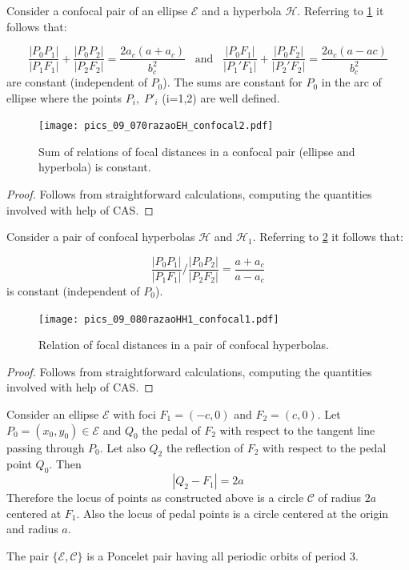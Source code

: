 \begin{proposition}
	Consider a confocal pair of an ellipse  $\mathcal{E}$ and a hyperbola $\mathcal{H}$. Referring to   \cref{fig:dEH} it follows that:
	
	\[\frac{|P_0P_1|}{|P_1F_1|}+\frac{|P_0P_2|}{|P_2F_2|}=\frac{2a_c(a+a_c)}{b_c^2}\;\;\; \text{and}\;\;\; \frac{|P_0F_1|}{|P_1'F_1|}+\frac{|P_0F_2|}{|P_2'F_2|}= \frac{2a_c(a-ac)}{b_c^2}\]
	are constant (independent of $P_0$).
 The sums  are constant for $P_0$ in the arc of ellipse  where the points $P_i,\; P'_i$ (i=1,2) are well defined.
\end{proposition}
\begin{figure} 
	\begin{center}
 \texttt{[image: pics\_09\_070razaoEH\_confocal2.pdf]}
		\caption { Sum of relations of focal distances in a confocal pair (ellipse and hyperbola) is constant.  }
		\label{fig:dEH}
	\end{center}
\end{figure}
\begin{proof}
Follows from straightforward calculations, computing the quantities involved with help of CAS. 
\end{proof}
\begin{proposition}
	Consider a pair of confocal hyperbolas $\mathcal{H}$ and $\mathcal{H}_1$. Referring to   \cref{fig:dHH} it follows that:
	
	\[\frac{|P_0P_1|}{|P_1F_1|}/\frac{|P_0P_2|}{|P_2F_2|}=\frac{a+a_c}{a-a_c}\]
	is constant (independent of $P_0$).
	
\end{proposition}
\begin{figure}
	\begin{center}
\texttt{[image: pics\_09\_080razaoHH1\_confocal1.pdf]}
		\caption { Relation of focal distances in a pair of confocal hyperbolas. }
		\label{fig:dHH}
	\end{center}
\end{figure}
\begin{proof}
Follows from straightforward calculations, computing the quantities involved with help of CAS. 
\end{proof}


\begin{proposition} \label{prop:pedal_circle} Consider an ellipse $\mathcal{E}$  with foci $F_1=(-c,0)$ and $F_2=(c,0)$. Let $P_0=(x_0,y_0)\in\mathcal{E}$ and $Q_0$ the pedal of $F_2$ with respect to the tangent line passing through $P_0$. Let also $Q_2$ the reflection of $F_2$ with respect to the pedal point $Q_0$.
	Then \[ |Q_2-F_1|=2a\]
	Therefore the locus of points as constructed above is a circle $\mathcal{C}$  of radius $2a$ centered at $F_1$.
	Also the locus of pedal points is a circle centered at the origin and radius $a$.
	
	The pair $\{\mathcal{E},\mathcal{C}\}$ is a Poncelet pair having all periodic orbits of period 3.
\end{proposition}

